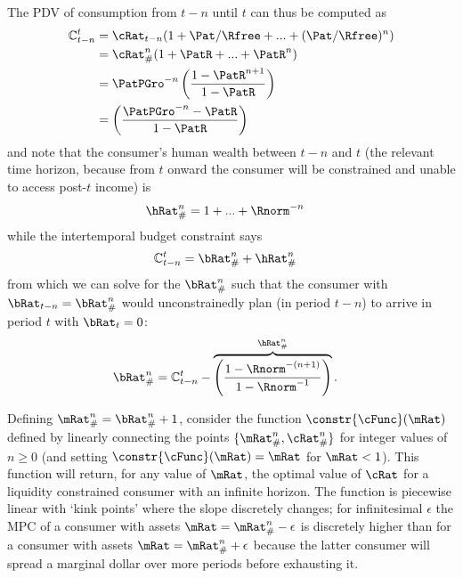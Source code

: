\documentclass[\econtexRoot/BufferStockTheory]{subfiles}
\begin{document}
The PDV of consumption from $t-n$ until $t$ can thus be computed as
\begin{equation}\begin{gathered}\begin{aligned}
  \mathbb{C}_{t-n}^{t}  & = \cRat_{t-n}(1+\Pat/\Rfree+ ... + (\Pat/\Rfree)^{n}) \notag
  \\  & = \cRat_{\#}^{n}(1+\PatR+ ... + \PatR^{n}) \notag
  \\  & = \PatPGro^{-n}\left(\frac{1-\PatR^{n+1}}{1-\PatR}\right) \label{PDVc}
  \\  & = \left(\frac{\PatPGro^{-n}-\PatR}{1-\PatR}\right) 
\end{aligned}\end{gathered}\end{equation}
and note that the consumer's human wealth between $t-n$ and $t$ (the relevant
time horizon, because from $t$ onward the consumer will be constrained
and unable to access post-$t$ income) is
\begin{equation}\begin{gathered}\begin{aligned}
  \hRat_{\#}^{n}  & = 1+...+\Rnorm^{-n}
\end{aligned}\end{gathered}\end{equation}
while the intertemporal budget constraint says
\begin{eqnarray*}
  \mathbb{C}_{t-n}^{t}  & = \bRat_{\#}^{n}+\hRat_{\#}^{n}
\end{eqnarray*}
from which we can solve for the $\bRat_{\#}^{n}$ such that
the consumer with $\bRat_{t-n} = \bRat_{\#}^{n}$ would
unconstrainedly plan (in period $t-n$) to arrive in period $t$ with
$\bRat_{t}=0$:
\begin{equation}\begin{gathered}\begin{aligned}
  \bRat_{\#}^{n} & =  \mathbb{C}_{t-n}^{t} - \overbrace{\left(\frac{1-\Rnorm^{-(n+1)}}{1-\Rnorm^{-1}}\right)}^{\hRat_{\#}^{n}} \label{eq:bPound}.
\end{aligned}\end{gathered}\end{equation}

Defining $\mRat_{\#}^{n}=\bRat_{\#}^{n}+1$, consider the function
$\constr{\cFunc}(\mRat)$ defined by linearly connecting the points
$\{\mRat_{\#}^{n},\cRat_{\#}^{n}\}$ for integer values of $n \geq 0$
(and setting $\constr{\cFunc}(\mRat)=\mRat$ for $\mRat<1$).  This
function will return, for any value of $\mRat$, the optimal value of
$\cRat$ for a liquidity constrained consumer with an infinite horizon.
The function is piecewise linear with `kink points' where the slope
discretely changes; for infinitesimal $\epsilon$ the MPC of a
consumer with assets $\mRat=\mRat_{\#}^{n}-\epsilon$ is discretely
higher than for a consumer with assets $\mRat=\mRat_{\#}^{n}+\epsilon$
because the latter consumer will spread a marginal dollar over more
periods before exhausting it.
\end{document}
